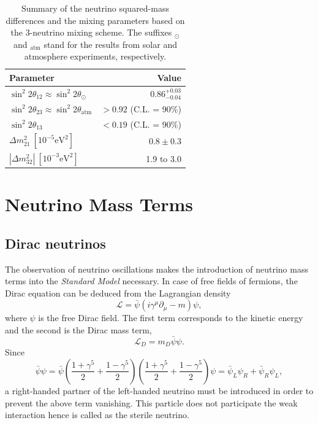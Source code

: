 \begin{table}[tbhp]
  \centering
  \caption{Summary of the neutrino squared-mass differences and the            
mixing parameters based on the 3-neutrino mixing scheme. The suffixes        
$_\odot$ and $_{\mbox{atm}}$ stand for the results from solar and        
atmosphere experiments, respectively.}
  \label{tab:par}
  \begin{tabular}{lr}\hline\hline
    Parameter & Value \\\hline
    $\sin^{2}2\theta_{12} \approx \sin^{2}2\theta_{\odot}$ &    
$0.86^{+0.03}_{-0.04}$ \\
    $\sin^{2}2\theta_{23} \approx \sin^{2}2\theta_{\mbox{atm}}$ &        
$>0.92$ (C.L. = 90\%) \\
    $\sin^{2}2\theta_{13}$ & $<0.19$ (C.L. = 90\%) \\
    $\Delta m^{2}_{21}~[10^{-5}\mbox{eV}^{2}]$ & $0.8 \pm 0.3$ \\
    $|\Delta m^{2}_{32}|~[10^{-3}\mbox{eV}^{2}]$ & 1.9 to 3.0        
\\\hline\hline
  \end{tabular}
\end{table}

\section{Neutrino Mass Terms}
\label{sec:nema}
\subsection{Dirac neutrinos}
\label{sec:dirac}
The observation of neutrino oscillations makes the introduction of
neutrino mass terms into the \emph{Standard Model} necessary. In case
of free fields of fermions, the Dirac equation can be deduced from the
Lagrangian density
\begin{equation}
  \label{eq:deq}
  \mathcal{L} = \bar{\psi} (i\gamma^{\mu}\partial_{\mu}-m) \psi,
\end{equation}
where $\psi$ is the free Dirac field. The first term corresponds to
the kinetic energy and the second is the Dirac mass term,
\begin{equation}
  \label{eq:dm}
  \mathcal{L}_D=m_{D}\bar{\psi}\psi.
\end{equation}
Since
\begin{equation}
  \label{eq:2psi}
  \bar{\psi}\psi =  \bar{\psi}    
\left(\frac{1+\gamma^5}{2}+\frac{1-\gamma^5}{2}\right)
  \left(\frac{1+\gamma^5}{2}+\frac{1-\gamma^5}{2}\right) \psi =
  \bar{\psi}_{L}\psi_{R}+\bar{\psi}_{R}\psi_{L},
\end{equation}
a right-handed partner of the left-handed neutrino must be introduced
in order to prevent the above term vanishing. This particle does not
participate the weak interaction hence is called as the sterile
neutrino.

